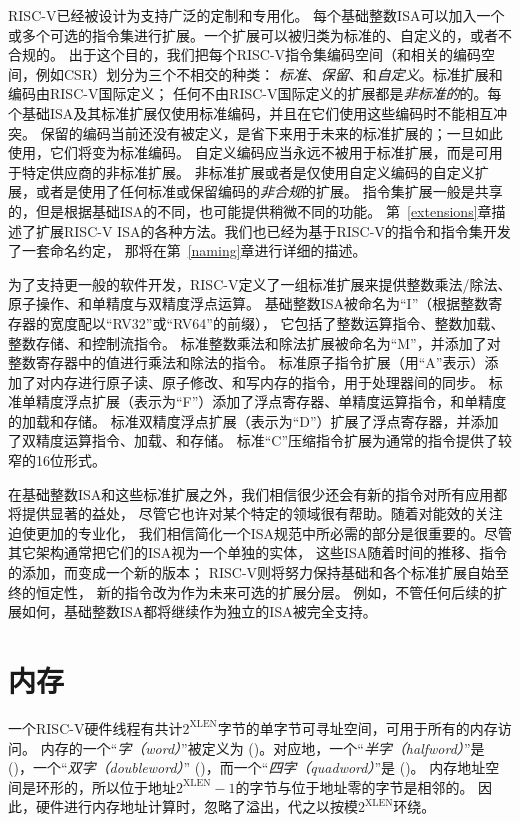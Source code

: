RISC-V已经被设计为支持广泛的定制和专用化。
每个基础整数ISA可以加入一个或多个可选的指令集进行扩展。一个扩展可以被归类为标准的、自定义的，或者不合规的。
出于这个目的，我们把每个RISC-V指令集编码空间（和相关的编码空间，例如CSR）划分为三个不相交的种类：
{\em 标准}、{\em 保留}、和{\em 自定义}。标准扩展和编码由RISC-V国际定义；
任何不由RISC-V国际定义的扩展都是{\em 非标准的}的。每个基础ISA及其标准扩展仅使用标准编码，并且在它们使用这些编码时不能相互冲突。
保留的编码当前还没有被定义，是省下来用于未来的标准扩展的；一旦如此使用，它们将变为标准编码。
自定义编码应当永远不被用于标准扩展，而是可用于特定供应商的非标准扩展。
非标准扩展或者是仅使用自定义编码的自定义扩展，或者是使用了任何标准或保留编码的{\em 非合规}的扩展。
指令集扩展一般是共享的，但是根据基础ISA的不同，也可能提供稍微不同的功能。
第~\ref{extensions}章描述了扩展RISC-V ISA的各种方法。我们也已经为基于RISC-V的指令和指令集开发了一套命名约定，
那将在第~\ref{naming}章进行详细的描述。


为了支持更一般的软件开发，RISC-V定义了一组标准扩展来提供整数乘法/除法、原子操作、和单精度与双精度浮点运算。
基础整数ISA被命名为“I”（根据整数寄存器的宽度配以“RV32”或“RV64”的前缀），
它包括了整数运算指令、整数加载、整数存储、和控制流指令。
标准整数乘法和除法扩展被命名为“M”，并添加了对整数寄存器中的值进行乘法和除法的指令。
标准原子指令扩展（用“A”表示）添加了对内存进行原子读、原子修改、和写内存的指令，用于处理器间的同步。
标准单精度浮点扩展（表示为“F”）添加了浮点寄存器、单精度运算指令，和单精度的加载和存储。
标准双精度浮点扩展（表示为“D”）扩展了浮点寄存器，并添加了双精度运算指令、加载、和存储。
标准“C”压缩指令扩展为通常的指令提供了较窄的16位形式。

在基础整数ISA和这些标准扩展之外，我们相信很少还会有新的指令对所有应用都将提供显著的益处，
尽管它也许对某个特定的领域很有帮助。随着对能效的关注迫使更加的专业化，
我们相信简化一个ISA规范中所必需的部分是很重要的。尽管其它架构通常把它们的ISA视为一个单独的实体，
这些ISA随着时间的推移、指令的添加，而变成一个新的版本；
RISC-V则将努力保持基础和各个标准扩展自始至终的恒定性，
新的指令改为作为未来可选的扩展分层。
例如，不管任何后续的扩展如何，基础整数ISA都将继续作为独立的ISA被完全支持。

\section{内存}

一个RISC-V硬件线程有共计$2^{\text{XLEN}}$字节的单字节可寻址空间，可用于所有的内存访问。
内存的一个“{\em 字（word）}”被定义为
()。对应地，一个“{\em 半字（halfword）}”是
()，一个“{\em 双字（doubleword）}”
()，而一个“{\em 四字（quadword）}”是
()。
内存地址空间是环形的，所以位于地址$2^{\text{XLEN}}-1$的字节与位于地址零的字节是相邻的。
因此，硬件进行内存地址计算时，忽略了溢出，代之以按模$2^{\text{XLEN}}$环绕。

